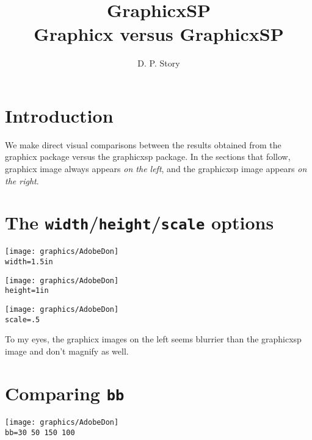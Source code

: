 \documentclass{article}
\title{\texorpdfstring{\textsf{GraphicxSP}\\\textsf{Graphicx} versus \textsf{GraphicxSP}}
    {GraphicxSP: Graphicx versus GraphicxSP}}
\author{D. P. Story}
\begin{document}
\maketitle

\section{Introduction}

We make direct visual comparisons between the results obtained from the
\textsf{graphicx} package versus the \textsf{graphicxsp} package. In the sections
that follow, \textsf{graphicx} image always appears \emph{on the left}, and the
\textsf{graphicxsp} image appears \emph{on the right}.

\section{The \texttt{width}/\texttt{height}/\texttt{scale} options}

\begin{center}
\texttt{[image: graphics/AdobeDon]}
\\[1ex]
\texttt{width=1.5in}
\end{center}

\goodbreak

\begin{center}
\texttt{[image: graphics/AdobeDon]}
\\[1ex]
        \texttt{height=1in}
\end{center}


\begin{center}
\texttt{[image: graphics/AdobeDon]}
\\[1ex]
\texttt{scale=.5}
\end{center}

\medskip
To my eyes, the \textsf{graphicx} images on the left seems blurrier
than the \textsf{graphicxsp} image and don't magnify as well.

\newpage

\section{Comparing \texttt{bb}}

\vspace{1in}

\begin{center}
\texttt{[image: graphics/AdobeDon]}\qquad\qquad
{}\\[3ex]
        \texttt{bb=30 50 150 100}
\end{center}
\end{document}
